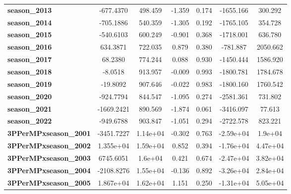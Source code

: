 \begin{center}
\begin{tabular}{lcccccc}
\textbf{season\_2013}         &    -677.4370  &      498.459     &    -1.359  &         0.174        &    -1655.166    &      300.292     \\
\textbf{season\_2014}         &    -705.1886  &      540.359     &    -1.305  &         0.192        &    -1765.105    &      354.728     \\
\textbf{season\_2015}         &    -540.6103  &      600.249     &    -0.901  &         0.368        &    -1718.001    &      636.780     \\
\textbf{season\_2016}         &     634.3871  &      722.035     &     0.879  &         0.380        &     -781.887    &     2050.662     \\
\textbf{season\_2017}         &      68.2380  &      774.244     &     0.088  &         0.930        &    -1450.444    &     1586.920     \\
\textbf{season\_2018}         &      -8.0518  &      913.957     &    -0.009  &         0.993        &    -1800.781    &     1784.678     \\
\textbf{season\_2019}         &     -19.8092  &      907.646     &    -0.022  &         0.983        &    -1800.160    &     1760.542     \\
\textbf{season\_2020}         &    -924.7794  &      844.547     &    -1.095  &         0.274        &    -2581.361    &      731.802     \\
\textbf{season\_2021}         &   -1669.2421  &      890.569     &    -1.874  &         0.061        &    -3416.097    &       77.613     \\
\textbf{season\_2022}         &    -949.6788  &      903.847     &    -1.051  &         0.294        &    -2722.578    &      823.221     \\
\textbf{3PPerMPxseason\_2001} &   -3451.7227  &     1.14e+04     &    -0.302  &         0.763        &    -2.59e+04    &      1.9e+04     \\
\textbf{3PPerMPxseason\_2002} &    1.355e+04  &     1.59e+04     &     0.852  &         0.394        &    -1.76e+04    &     4.47e+04     \\
\textbf{3PPerMPxseason\_2003} &    6745.6051  &      1.6e+04     &     0.421  &         0.674        &    -2.47e+04    &     3.82e+04     \\
\textbf{3PPerMPxseason\_2004} &   -2108.8276  &     1.55e+04     &    -0.136  &         0.892        &    -3.26e+04    &     2.84e+04     \\
\textbf{3PPerMPxseason\_2005} &    1.867e+04  &     1.62e+04     &     1.151  &         0.250        &    -1.31e+04    &     5.05e+04     \\

\end{tabular}
\end{center}
